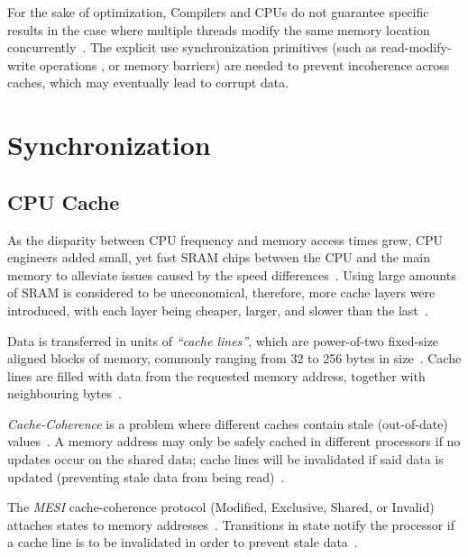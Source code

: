 For the sake of optimization, Compilers and CPUs do not guarantee specific
results in the case where multiple threads modify the same memory location
concurrently~\citep{drepper2007every}. The explicit use synchronization primitives (such as read-modify-write operations
, or memory barriers) are needed to prevent incoherence
across caches, which may eventually lead to corrupt data.

\section{Synchronization}
\subsection{CPU Cache}
As the disparity between CPU frequency and memory access times grew, 
CPU engineers added small, yet fast SRAM chips between the CPU
and the main memory to alleviate issues caused by the speed
differences~\citep{cantrill2008real,drepper2007every,perfbook2021}. Using large
amounts of SRAM is considered to be uneconomical, therefore, more cache layers
were introduced, with each layer being cheaper, larger, and slower than the
last~\citep{drepper2007every,perfbook2021}.

Data is transferred in units of \emph{``cache lines''}, which are power-of-two
fixed-size aligned blocks of memory, commonly ranging from 32 to 256 bytes in
size~\citep[Section~3.2.1]{perfbook2021}. Cache lines are filled with data from the requested memory address,
together with neighbouring bytes~\citep[Section~3.2.1]{perfbook2021}.


\emph{Cache-Coherence} is a problem where different caches contain stale
(out-of-date) values~\citep[Appendix~B.5.1]{herlihy2020art}. A memory address
may only be safely cached in different processors if no updates
occur on the shared data; cache lines will be
invalidated if said data is updated (preventing stale data from being read)~\citep[Appendix~B.5.1]{herlihy2020art}. 

The \emph{MESI} cache-coherence protocol (Modified, Exclusive, Shared,
or Invalid) attaches states to memory addresses~\citep[Appendix~B.5.1]{herlihy2020art}. Transitions in
state notify the processor if a cache line is to be invalidated in order to
prevent stale data~\citep[Appendix~B.5.1]{herlihy2020art}.

